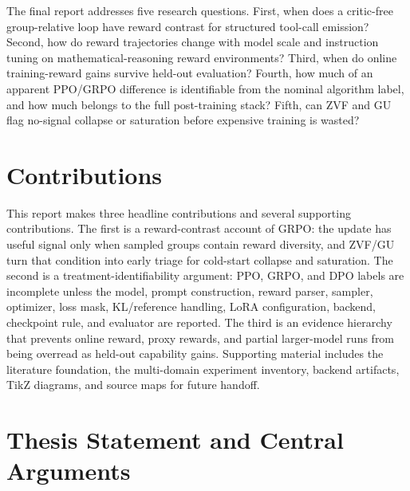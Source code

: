 \documentclass[12pt,a4paper]{report}
\begin{document}
The final report addresses five research questions. First, when does a critic-free group-relative loop have reward contrast for structured tool-call emission? Second, how do reward trajectories change with model scale and instruction tuning on mathematical-reasoning reward environments? Third, when do online training-reward gains survive held-out evaluation? Fourth, how much of an apparent PPO/GRPO difference is identifiable from the nominal algorithm label, and how much belongs to the full post-training stack? Fifth, can ZVF and GU flag no-signal collapse or saturation before expensive training is wasted?

\section{Contributions}
\label{sec:contributions}

This report makes three headline contributions and several supporting contributions. The first is a reward-contrast account of GRPO: the update has useful signal only when sampled groups contain reward diversity, and ZVF/GU turn that condition into early triage for cold-start collapse and saturation. The second is a treatment-identifiability argument: PPO, GRPO, and DPO labels are incomplete unless the model, prompt construction, reward parser, sampler, optimizer, loss mask, KL/reference handling, LoRA configuration, backend, checkpoint rule, and evaluator are reported. The third is an evidence hierarchy that prevents online reward, proxy rewards, and partial larger-model runs from being overread as held-out capability gains. Supporting material includes the literature foundation, the multi-domain experiment inventory, backend artifacts, TikZ diagrams, and source maps for future handoff.

\section{Thesis Statement and Central Arguments}
\label{sec:central-arguments}
\end{document}
